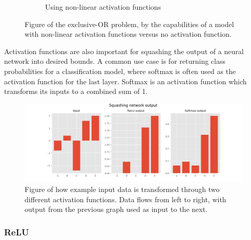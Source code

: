 \begin{figure}[H]
\begin{subfigure}{.45\textwidth}
        \caption{Using non-linear activation functions}%

    \end{subfigure}
    
    \caption{Figure of the exclusive-OR problem, by the capabilities of a model with non-linear activation functions versus no activation function.}
    \label{fig:exclusive-OR problem}
\end{figure}

Activation functions are also important for squashing the output of a neural network into desired bounds. A common use case is for returning class probabilities for a classification model, where softmax is often used as the activation function for the last layer. Softmax is an activation function which transforms its inputs to a combined sum of 1.\cite{sharma_understanding_2018}

\begin{figure}[H]
  \centering
    \includegraphics[width=\textwidth]{Assets/Chapter2_Theory/squashin_output_data_using_activation_functions.png}
    \caption{Figure of how example input data is transformed through two different activation functions. Data flows from left to right, with output from the previous graph used as input to the next.}
\end{figure}




\subsubsection{ReLU}

